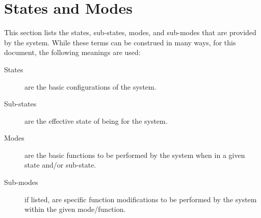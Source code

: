 \KNEADSECTIONNEWPAGE
\section{States and Modes}
\label{sec:StatesAndModes}
% 

This section lists the states, sub-states, modes, and sub-modes that are provided by the system.
While these terms can be construed in many ways, for this document, the following meanings are used:
\begin{description}
	\item[States] are the basic configurations of the system.
	\item[Sub-states] are the effective state of being for the system.
	\item[Modes] are the basic functions to be performed by the system when in a given state and/or sub-state.
	\item[Sub-modes] if listed, are specific function modifications to be performed by the system within the given mode/function.
\end{description}

